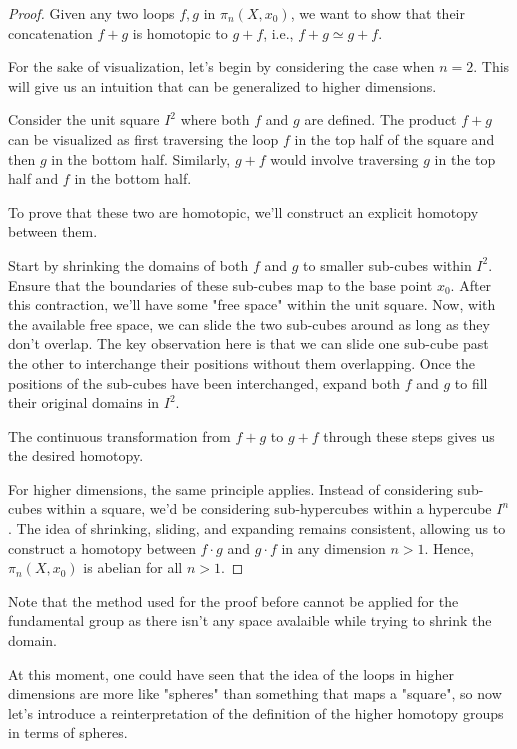\documentclass[12pt]{article}
\begin{document}
\begin{proof}
	Given any two loops \( f, g \) in \( \pi_n(X, x_0) \), we want to show that their concatenation \( f + g \) is homotopic to \( g + f \), i.e., \( f + g \simeq g + f \).

	For the sake of visualization, let's begin by considering the case when \( n = 2 \). This will give us an intuition that can be generalized to higher dimensions.

	Consider the unit square \( I^2 \) where both \( f \) and \( g \) are defined. The product \( f + g \) can be visualized as first traversing the loop \( f \) in the top half of the square and then \( g \) in the bottom half. Similarly, \( g + f \) would involve traversing \( g \) in the top half and \( f \) in the bottom half.

	To prove that these two are homotopic, we'll construct an explicit homotopy between them.

	Start by shrinking the domains of both \( f \) and \( g \) to smaller sub-cubes within \( I^2 \). Ensure that the boundaries of these sub-cubes map to the base point \( x_0 \). After this contraction, we'll have some "free space" within the unit square. Now, with the available free space, we can slide the two sub-cubes around as long as they don't overlap. The key observation here is that we can slide one sub-cube past the other to interchange their positions without them overlapping. Once the positions of the sub-cubes have been interchanged, expand both \( f \) and \( g \) to fill their original domains in \( I^2 \).


	The continuous transformation from \( f + g \) to \( g + f \) through these steps gives us the desired homotopy.

	For higher dimensions, the same principle applies. Instead of considering sub-cubes within a square, we'd be considering sub-hypercubes within a hypercube \( I^n \). The idea of shrinking, sliding, and expanding remains consistent, allowing us to construct a homotopy between \( f \cdot g \) and \( g \cdot f \) in any dimension \( n > 1 \). Hence, \( \pi_n(X, x_0) \) is abelian for all \( n > 1 \).
\end{proof}

Note that the method used for the proof before cannot be applied for the fundamental group as there isn't any space avalaible while trying to shrink the domain.

At this moment, one could have seen that the idea of the loops in higher dimensions are more like "spheres" than something that maps a "square", so now let's introduce a reinterpretation of the definition of the higher homotopy groups in terms of spheres.
\end{document}
